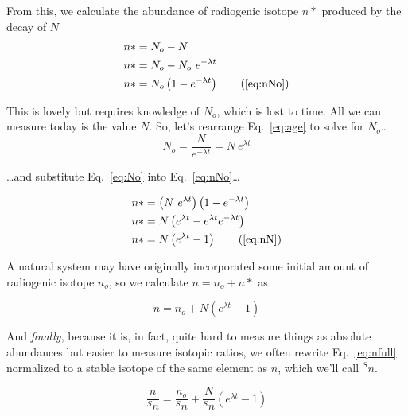 \documentclass[12pt, letterpaper,twocolumn]{article}
\begin{document}
From this, we calculate the abundance of radiogenic isotope $n*$ produced by the decay of $N$
\begin{subequations}\label{eq:nNo}
\begin{align*}
    n* &= N_o - N 
\\
    n* &= N_o - N_o~e^{-\lambda t}
\\
    n* &= N_o \left( 1 - e^{-\lambda t} \right) \tag{\ref{eq:nNo}}
\end{align*}
\end{subequations}

This is lovely but requires knowledge of $N_o$, which is lost to time. 
All we can measure today is the value $N$.
So, let's rearrange Eq.~\ref{eq:age} to solve for $N_o$\dots
\begin{equation} \label{eq:No}
    N_o = \frac{N}{e^{-\lambda t}} = N~e^{\lambda t}
\end{equation}

\dots and substitute Eq.~\ref{eq:No} into Eq.~\ref{eq:nNo}\dots

\begin{subequations}\label{eq:nN}
\begin{align*}
     n* &= \left(N~e^{\lambda t}\right) \left( 1 - e^{-\lambda t}\right) 
     \\
     n* &= N \left( e^{\lambda t} - e^{\lambda t} e^{-\lambda t}\right) 
     \\
     n* &= N \left( e^{\lambda t} - 1 \right) \tag{\ref{eq:nN}}
\end{align*}
\end{subequations}

A natural system may have originally incorporated some initial amount of radiogenic isotope $n_o$, so  we calculate $n = n_o + {n*}$ as

\begin{equation}\label{eq:nfull}
    n = n_o + N \left( e^{\lambda t} - 1 \right)
\end{equation}

And \emph{finally}, because it is, in fact, quite hard to measure things as absolute abundances but easier to measure isotopic ratios, we often rewrite Eq.~\ref{eq:nfull} normalized to a stable isotope of the same element as $n$, which we'll call $^S n$.

\begin{equation}\label{eq:ratios}
    \frac{n}{^S n} = \frac{n_o}{^S n} + \frac{N}{^S n} \left( e^{\lambda t} - 1 \right)
\end{equation}
\end{document}

